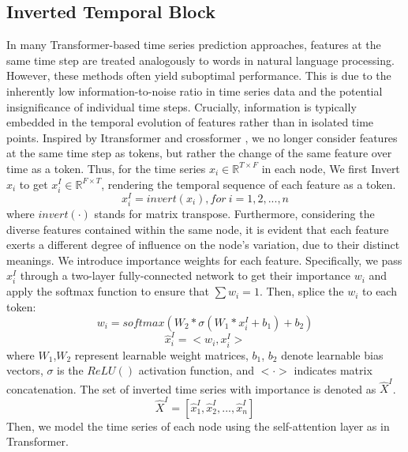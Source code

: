 \subsection{Inverted Temporal Block}
In many Transformer-based time series prediction approaches, features at the same time step are treated analogously to words in natural language processing. However, these methods often yield suboptimal performance. This is due to the inherently low information-to-noise ratio in time series data and the potential insignificance of individual time steps. Crucially, information is typically embedded in the temporal evolution of features rather than in isolated time points. Inspired by Itransformer\cite{itransformer} and crossformer\cite{crossformer} , we no longer consider features at the same time step as tokens, but rather the change of the same feature over time as a token. Thus, for the time series $x_i\in \mathbb{R}^{T\times F}$ in each node, We first Invert $x_i$ to get $x_i^{I}\in \mathbb{R}^{F\times T}$, rendering the temporal sequence of each feature as a token.
\begin{equation}
    x^{I}_{i}=invert(x_i), for\ i = 1,2,...,n
\end{equation}
where $invert(\cdot)$ stands for matrix transpose. Furthermore, considering the diverse features contained within the same node, it is evident that each feature exerts a different degree of influence on the node's variation, due to their distinct meanings. 
We introduce importance weights for each feature. Specifically, we pass $x_i^{I}$ through a two-layer fully-connected network to get their importance $w_i$ and  apply the softmax function to ensure that $\sum{w_i} =1$. Then, splice the $w_i$ to each token:
\begin{equation}
    w_i=softmax(W_2*\sigma(W_1*x^{I}_i+b_1)+b_2)
\end{equation}
\begin{equation}
    \hat{x}^{I}_i=<w_i,x^{I}_i>
\end{equation}
where $W_1$,$W_2$ represent learnable weight matrices, $b_1$, $b_2$ denote learnable bias vectors, $\sigma$ is the $ReLU()$ activation function, and $<\cdot>$ indicates matrix concatenation. The set of inverted time series with importance is denoted as $\hat{X}^{I}$.
\begin{equation}
    \hat{X}^{I}=[\hat{x}^{I}_1,\hat{x}^{I}_2,...,\hat{x}^{I}_n]
\end{equation}
Then, we model the time series of each node using the self-attention layer as in Transformer\cite{vaswani2017attention}.
